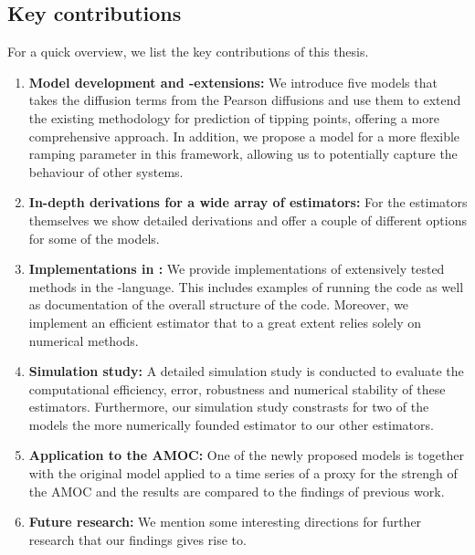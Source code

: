 \subsection{Key contributions}
For a quick overview, we list the key contributions of this thesis.
\begin{enumerate}
    \item \textbf{Model development and -extensions:} We introduce five models that takes the diffusion terms from the Pearson diffusions and use them to extend the existing methodology for prediction of tipping points, offering a more comprehensive approach. In addition, we propose a model for a more flexible ramping parameter in this framework, allowing us to potentially capture the behaviour of other systems.
    \item \textbf{In-depth derivations for a wide array of estimators:} For the estimators themselves we show detailed derivations and offer a couple of different options for some of the models. 
    \item \textbf{Implementations in :} We provide implementations of extensively tested methods in the -language. This includes examples of running the code as well as documentation of the overall structure of the code. Moreover, we implement an efficient estimator that to a great extent relies solely on numerical methods. 
    \item \textbf{Simulation study:} A detailed simulation study is conducted to evaluate the computational efficiency, error, robustness and numerical stability of these estimators. Furthermore, our simulation study constrasts for two of the models the more numerically founded estimator to our other estimators. 
    \item \textbf{Application to the AMOC:} One of the newly proposed models is together with the original model applied to a time series of a proxy for the strengh of the AMOC and the results are compared to the findings of previous work.
    \item \textbf{Future research:} We mention some interesting directions for further research that our findings gives rise to.
\end{enumerate}
